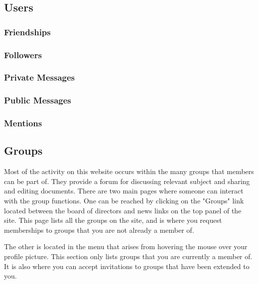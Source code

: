 \documentclass[10pt]{article}
\begin{document}
\subsection{Users}
\subsubsection{Friendships} \label{Friendships}
\subsubsection{Followers}
\subsubsection{Private Messages}
\subsubsection{Public Messages}
\subsubsection{Mentions}



\subsection{Groups}
\begin{flushleft}
Most of the activity on this website occurs within the many groups that members can be part of.  They provide a forum for discussing relevant subject and sharing and editing documents.  There are two main pages where someone can interact with the group functions.  One can be reached by clicking on the "Groups" link located between the board of directors and news links on the top panel of the site.  This page lists all the groups on the site, and is where you request memberships to groups that you are not already a member of. 
\end{flushleft}

\begin{flushleft}
The other is located in the menu that arises from hovering the mouse over your profile picture. This section only lists groups that you are currently a member of.  It is also where you can accept invitations to groups that have been extended to you. 
\end{flushleft}
\end{document}
